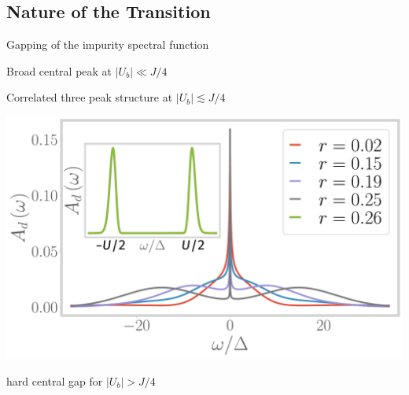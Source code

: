 \documentclass[9pt,aspectratio=169]{beamer}
\begin{document}
\begin{frame}{}
\section{Nature of the Transition}
\end{frame}

\begin{frame}{Gapping of the impurity spectral function}
\begin{minipage}{0.25\textwidth}
\begin{itemize}
\nitem Broad central peak at \(|U_b| \ll J/4\)
\end{itemize}
\end{minipage}
\hspace{\fill}
\begin{minipage}{0.45\textwidth}
\begin{itemize}
\nitem Correlated \alert{three peak} structure at \(|U_b| \lesssim J/4\)\\[10pt]
\end{itemize}
\includegraphics[width=\textwidth]{Add.pdf}
\end{minipage}
\hspace{\fill}
\begin{minipage}{0.25\textwidth}
\begin{itemize}
\nitem hard central \alert{gap} for  \(|U_b| > J/4\)
\end{itemize}
\end{minipage}

\end{frame}
\end{document}
